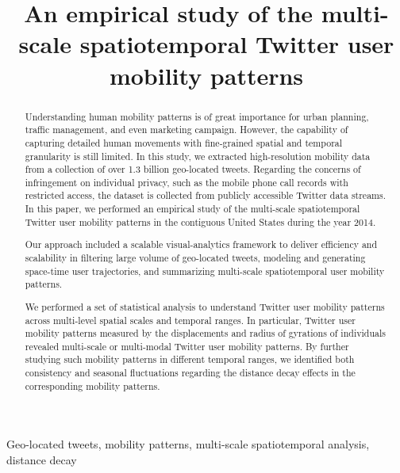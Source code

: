 \documentclass{elsart}
\begin{document}
\begin{frontmatter}



\title{An empirical study of the multi-scale spatiotemporal Twitter user mobility patterns}


\author{}

\address{}

\begin{abstract}
Understanding human mobility patterns is of great importance for urban planning, traffic management, and even marketing campaign.
However, the capability of capturing detailed human movements with fine-grained spatial and temporal granularity is still limited.
In this study, we extracted high-resolution mobility data from a collection of over 1.3 billion geo-located tweets.
Regarding the concerns of infringement on individual privacy, such as the mobile phone call records with restricted access, the dataset is collected from publicly accessible Twitter data streams. In this paper, we performed an empirical study of the multi-scale spatiotemporal Twitter user mobility patterns in the contiguous United States during the year 2014.

Our approach included a scalable visual-analytics framework to deliver efficiency and scalability in filtering large volume of geo-located tweets, modeling and generating space-time user trajectories, and summarizing multi-scale spatiotemporal user mobility patterns.

We performed a set of statistical analysis to understand Twitter user mobility patterns across multi-level spatial scales and temporal ranges.
In particular, Twitter user mobility patterns measured by the displacements and radius of gyrations of individuals revealed multi-scale or multi-modal Twitter user mobility patterns.
By further studying such mobility patterns in different temporal ranges, we identified both consistency and seasonal fluctuations regarding the distance decay effects in the corresponding mobility patterns.
\end{abstract}

\begin{keyword}
Geo-located tweets, mobility patterns, multi-scale spatiotemporal analysis, distance decay
\end{keyword}
\end{frontmatter}
\end{document}
